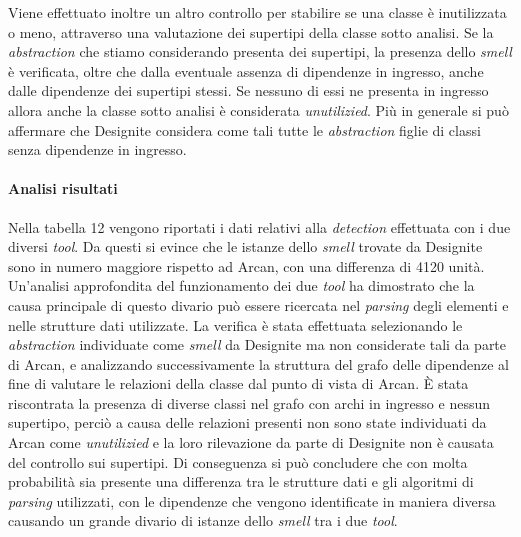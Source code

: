         Viene effettuato inoltre un altro controllo per stabilire se una classe è inutilizzata o meno, attraverso una valutazione dei supertipi della classe sotto analisi. Se la \textit{abstraction} che stiamo considerando presenta dei supertipi, la presenza dello \textit{smell} è verificata, oltre che dalla eventuale assenza di dipendenze in ingresso, anche dalle dipendenze dei supertipi stessi. Se nessuno di essi ne presenta in ingresso allora anche la classe sotto analisi è considerata \textit{unutilizied}. Più in generale si può affermare che Designite considera come tali tutte le \textit{abstraction} figlie di classi senza dipendenze in ingresso. 
        
    \paragraph{Analisi risultati}
        Nella tabella 12 vengono riportati i dati relativi alla \textit{detection} effettuata con i due diversi \textit{tool}. Da questi si evince che le istanze dello \textit{smell} trovate da Designite sono in numero maggiore rispetto ad Arcan, con una differenza di 4120 unità. Un'analisi approfondita del funzionamento dei due \textit{tool} ha dimostrato che la causa principale di questo divario può essere ricercata nel \textit{parsing} degli elementi e nelle strutture dati utilizzate. La verifica è stata effettuata selezionando le \textit{abstraction} individuate come \textit{smell} da Designite ma non considerate tali da parte di Arcan, e analizzando successivamente la struttura del grafo delle dipendenze al fine di valutare le relazioni della classe dal punto di vista di Arcan.
        È stata riscontrata la presenza di diverse classi nel grafo con archi in ingresso e nessun supertipo, perciò a causa delle relazioni presenti non sono state individuati da Arcan come \textit{unutilizied} e la loro rilevazione da parte di Designite non è causata del controllo sui supertipi. Di conseguenza si può concludere che con molta probabilità sia presente una differenza tra le strutture dati e gli algoritmi di \textit{parsing} utilizzati, con le dipendenze che vengono identificate in maniera diversa causando un grande divario di istanze dello \textit{smell} tra i due \textit{tool}.
        
